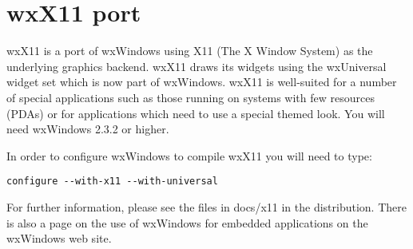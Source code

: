 \section{wxX11 port}\label{wxx11port}

wxX11 is a port of wxWindows using X11 (The X Window System)
as the underlying graphics backend. wxX11 draws its widgets
using the wxUniversal widget set which is now part of wxWindows.
wxX11 is well-suited for a number of special applications such
as those running on systems with few resources (PDAs) or for
applications which need to use a special themed look. You will need
wxWindows 2.3.2 or higher.

In order to configure wxWindows to compile wxX11 you will 
need to type:

\begin{verbatim}
configure --with-x11 --with-universal
\end{verbatim}

For further information, please see the files in docs/x11
in the distribution. There is also a page on the use of
wxWindows for embedded applications on the wxWindows web site.


